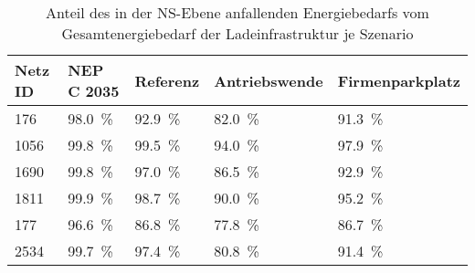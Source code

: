 {
\renewcommand{\arraystretch}{1.2}%
\begin{table}[H]
	\begin{center}
		\caption{Anteil des in der NS-Ebene anfallenden Energiebedarfs vom Gesamtenergiebedarf der Ladeinfrastruktur je Szenario}
		\begin{tabu} to \textwidth {X[0.5] X[1, r] X[1, r] X[1.2, r] X[1.2, r]}
			\hline
			Netz ID    & NEP C \num{2035}    & Referenz            & Antriebswende       & \glqq Firmenparkplatz\grqq \\ \hline
			\num{176}  & \SI{98.0}{\percent} & \SI{92.9}{\percent} & \SI{82.0}{\percent} & \SI{91.3}{\percent}        \\
			\num{1056} & \SI{99.8}{\percent} & \SI{99.5}{\percent} & \SI{94.0}{\percent} & \SI{97.9}{\percent}        \\
			\num{1690} & \SI{99.8}{\percent} & \SI{97.0}{\percent} & \SI{86.5}{\percent} & \SI{92.9}{\percent}        \\
			\num{1811} & \SI{99.9}{\percent} & \SI{98.7}{\percent} & \SI{90.0}{\percent} & \SI{95.2}{\percent}        \\
			\num{177}  & \SI{96.6}{\percent} & \SI{86.8}{\percent} & \SI{77.8}{\percent} & \SI{86.7}{\percent}        \\
			\num{2534} & \SI{99.7}{\percent} & \SI{97.4}{\percent} & \SI{80.8}{\percent} & \SI{91.4}{\percent}        \\ \hline
		\end{tabu}
		\label{tab:lvConnectionShare}
	\end{center}
	\vspace{-3mm}%
\end{table}
}